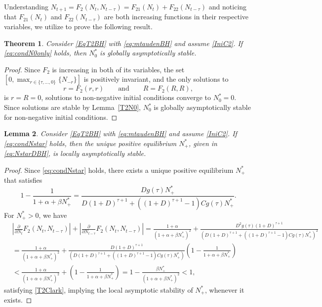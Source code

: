 \documentclass{article}
\newtheorem{theorem}{Theorem}
\numberwithin{theorem}{section}
\newtheorem{lemma}[theorem]{Lemma}
\begin{document}
{Understanding $N_{t+1}=F_2(N_t,N_{t-\tau})=F_{21}(N_t)+F_{22}(N_{t-\tau})$ and noticing that $F_{21}(N_t)$ and $F_{22}(N_{t-\tau})$ are both increasing functions in their respective variables, we utilize \cite[Theorem~1.15]{Ladas_2004} to prove the following result. 

\begin{theorem}
    Consider \eqref{EqT2BH} with \eqref{eq:mtaudenBH} and assume \eqref{IniC2}. If \eqref{eq:condN0only} holds, then $N^*_0$ is globally asymptotically stable. 
\end{theorem}

\begin{proof}
    Since $F_{2}$ is increasing in both of its variables, the set $[0, \max_{r\in \{\tau, \ldots, 0\}}\{N_{-r}\}]$ is positively invariant,  and the only solutions to 
    $$r=F_2(r,r)\qquad \mbox{and}\qquad R=F_2(R,R),$$
    is $r=R=0$, solutions to non-negative initial conditions converge to $N^*_0=0$. Since solutions are stable by Lemma~\ref{T2N0}, $N^*_0$ is globally asymptotically stable for non-negative initial conditions.     
\end{proof}

\begin{lemma}
    Consider \eqref{EqT2BH} with \eqref{eq:mtaudenBH} and assume \eqref{IniC2}. If \eqref{eq:condNstar} holds, then the unique positive equilibrium $N^*_+$, given in \eqref{eq:NstarDBH}, is locally asymptotically stable. 
\end{lemma}

\begin{proof}
Since \eqref{eq:condNstar} holds, there exists a unique positive equilibrium $N^*_+$ that satisfies 
$$1-\frac{1}{1+\alpha+\beta N^*_+}=\frac{Dg(\tau)N^*_+}{D(1+D)^{\tau+1}+((1+D)^{\tau+1}-1)Cg(\tau)N^*_+}.$$
For $N^*_+>0$, we have 
\begin{align*}
&\left|\frac{\partial}{\partial N_t}F_2(N_t,N_{t-\tau})\right|+\left|\frac{\partial}{\partial N_{t-\tau}}F_2(N_t,N_{t-\tau})\right|=\frac{1+\alpha}{(1+\alpha +\beta N^*_+)^2}+\frac{D^2g(\tau)(1+D)^{\tau+1}}{(D(1+D)^{\tau+1}+((1+D)^{\tau+1}-1)Cg(\tau)N_+^*)^2}\\
&=\frac{1+\alpha}{(1+\alpha +\beta N^*_+)^2}+\frac{D(1+D)^{\tau+1}}{(D(1+D)^{\tau+1}+((1+D)^{\tau+1}-1)Cg(\tau)N_+^*)}\left(1-\frac{1}{1+\alpha+\beta N^*_+}\right)\\
&< \frac{1+\alpha}{(1+\alpha +\beta N^*_+)^2}+\left(1-\frac{1}{1+\alpha+\beta N^*_+}\right)=1-\frac{\beta N^*_+}{(1+\alpha+\beta N^*_+)^2}<1,
\end{align*}
satisfying \eqref{T2Clark}, implying the local asymptotic stability of $N^*_+$, whenever it exists. 
\end{proof}


}
\end{document}
